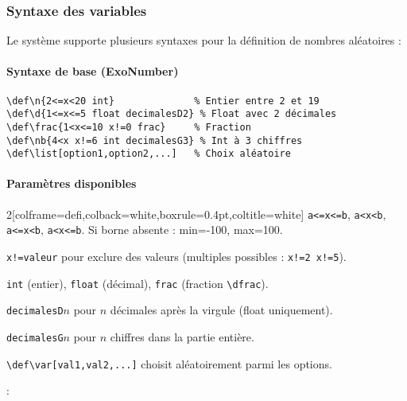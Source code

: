 \subsubsection{Syntaxe des variables}

Le système supporte plusieurs syntaxes pour la définition de nombres aléatoires :

\paragraph{Syntaxe de base (ExoNumber)}

\begin{tcolorbox}[colback=white,colframe=defi,boxrule=0.4pt]
\begin{verbatim}
\def\n{2<=x<20 int}              % Entier entre 2 et 19
\def\d{1<=x<=5 float decimalesD2} % Float avec 2 décimales
\def\frac{1<x<=10 x!=0 frac}     % Fraction
\def\nb{4<x x!=6 int decimalesG3} % Int à 3 chiffres
\def\list[option1,option2,...]   % Choix aléatoire
\end{verbatim}
\end{tcolorbox}

\paragraph{Paramètres disponibles}

\begin{MultiColonnes}{2}[colframe=defi,colback=white,boxrule=0.4pt,coltitle=white]
    \tcbitem[title=Bornes] \texttt{a<=x<=b}, \texttt{a<x<b}, \texttt{a<=x<b}, \texttt{a<x<=b}. Si borne absente : min=-100, max=100.

    \tcbitem[title=Exclusions] \texttt{x!=valeur} pour exclure des valeurs (multiples possibles : \texttt{x!=2 x!=5}).

    \tcbitem[title=Type] \texttt{int} (entier), \texttt{float} (décimal), \texttt{frac} (fraction \texttt{\textbackslash dfrac}).

    \tcbitem[title=Décimales droite] \texttt{decimalesD$n$} pour $n$ décimales après la virgule (float uniquement).

    \tcbitem[title=Décimales gauche] \texttt{decimalesG$n$} pour $n$ chiffres dans la partie entière.

    \tcbitem[title=Listes] \texttt{\textbackslash def\textbackslash var[val1,val2,...]} choisit aléatoirement parmi les options.
\end{MultiColonnes}

 :

